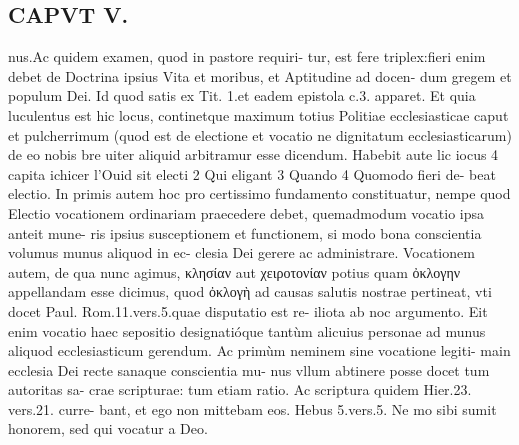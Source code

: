 \documentclass{article}
\begin{document}
\begin{pages}
\section*{CAPVT  V. }
\marginpar{[ p.241 ]}\pstart nus.Ac quidem examen, quod in pastore requiri- tur, est fere triplex:fieri enim debet de Doctrina ipsius Vita et moribus, et Aptitudine ad docen- dum gregem et populum Dei. Id quod satis ex Tit. 1.et eadem epistola c.3. apparet.  \pend\pstart Et quia luculentus est hic locus, continetque maximum totius Politiae ecclesiasticae caput et pulcherrimum (quod est de electione et vocatio ne dignitatum ecclesiasticarum) de eo nobis bre uiter aliquid arbitramur esse dicendum. Habebit aute lic iocus 4 capita ichicer l'Ouid sit electi 2 Qui eligant 3 Quando 4 Quomodo fieri de- beat electio. In primis autem hoc pro certissimo fundamento constituatur, nempe quod  \pend\pstart Electio vocationem ordinariam praecedere debet, quemadmodum vocatio ipsa anteit mune- ris ipsius susceptionem et functionem, si modo bona conscientia volumus munus aliquod in ec- clesia Dei gerere ac administrare. Vocationem autem, de qua nunc agimus, κλησίαν aut χειροτονίαν potius quam ὀκλογην appellandam esse dicimus, quod ὀκλογὴ ad causas salutis nostrae pertineat, vti docet Paul. Rom.11.vers.5.quae disputatio est re- iliota ab noc argumento. Eit enim vocatio haec sepositio designatióque tantùm alicuius personae ad munus aliquod ecclesiasticum gerendum.  \pend\pstart Ac primùm neminem sine vocatione legiti- main ecclesia Dei recte sanaque conscientia mu- nus vllum abtinere posse docet tum autoritas sa- crae scripturae: tum etiam ratio.  \pend\pstart Ac scriptura quidem Hier.23. vers.21. curre- bant, et ego non mittebam eos. Hebus 5.vers.5. Ne mo sibi sumit honorem, sed qui vocatur a Deo.  \pend

\end{pages}
\end{document}

